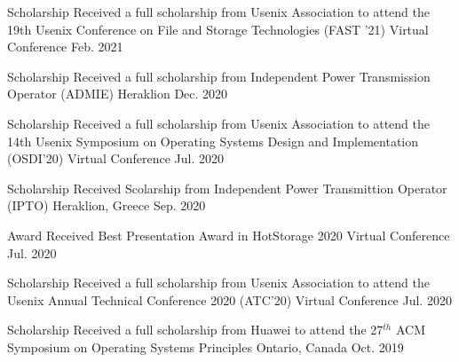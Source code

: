 

\begin{cvhonors}
  \cvhonor
    {Scholarship} %
	{Received a full scholarship from Usenix Association to attend the
	19th Usenix Conference on File and Storage Technologies (FAST '21)
	} %
    {Virtual Conference} %
    {Feb. 2021} %

  \cvhonor
    {Scholarship} %
	{Received a full scholarship from Independent Power Transmission
	Operator (ADMIE)} %
    {Heraklion} %
    {Dec. 2020} %

  \cvhonor
    {Scholarship} %
	{Received a full scholarship from Usenix Association to attend the
	14th Usenix Symposium on Operating Systems Design and
Implementation (OSDI'20)} %
    {Virtual Conference} %
    {Jul. 2020} %

  \cvhonor
    {Scholarship} %
	{Received Scolarship from Independent Power Transmittion Operator
	(IPTO)} %
    {Heraklion, Greece} %
    {Sep. 2020} %

  \cvhonor
    {Award} %
    {Received Best Presentation Award in HotStorage 2020} %
    {Virtual Conference} %
    {Jul. 2020} %

  \cvhonor
    {Scholarship} %
    {Received a full scholarship from Usenix Association to attend the
    Usenix Annual Technical Conference 2020 (ATC'20)} %
    {Virtual Conference} %
    {Jul. 2020} %

  \cvhonor
    {Scholarship} %
    {Received a full scholarship from Huawei to attend the 27$^{th}$
    ACM Symposium on Operating Systems Principles} %
    {Ontario, Canada} %
    {Oct. 2019} %


\end{cvhonors}
